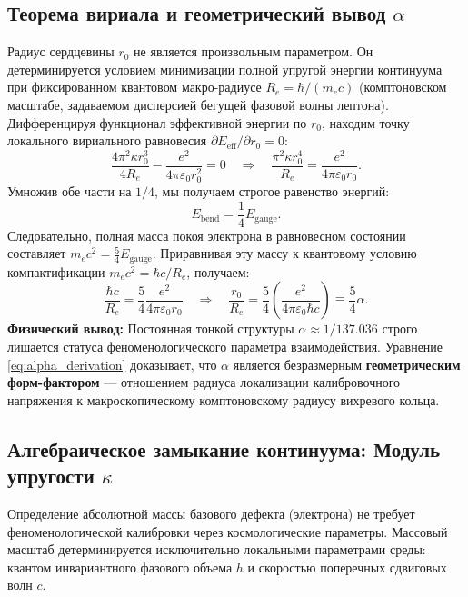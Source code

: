 \documentclass[11pt,a4paper]{article}
\begin{document}
\subsection{Теорема вириала и геометрический вывод $\alpha$}
Радиус сердцевины $r_0$ не является произвольным параметром. Он детерминируется условием минимизации полной упругой энергии континуума при фиксированном квантовом макро-радиусе $R_e = \hbar / (m_e c)$ (комптоновском масштабе, задаваемом дисперсией бегущей фазовой волны лептона).
Дифференцируя функционал эффективной энергии по $r_0$, находим точку локального вириального равновесия $\partial E_{\text{eff}} / \partial r_0 = 0$:
\begin{equation}
\frac{4 \pi^2 \kappa r_0^3}{4R_e} - \frac{e^2}{4\pi\varepsilon_0 r_0^2} = 0 \quad \Longrightarrow \quad \frac{\pi^2 \kappa r_0^4}{R_e} = \frac{e^2}{4\pi\varepsilon_0 r_0}.
\end{equation}
Умножив обе части на $1/4$, мы получаем строгое равенство энергий:
\begin{equation}
E_{\text{bend}} = \frac{1}{4} E_{\text{gauge}}.
\end{equation}
Следовательно, полная масса покоя электрона в равновесном состоянии составляет $m_e c^2 = \frac{5}{4} E_{\text{gauge}}$. Приравнивая эту массу к квантовому условию компактификации $m_e c^2 = \hbar c / R_e$, получаем:
\begin{equation}
\frac{\hbar c}{R_e} = \frac{5}{4} \frac{e^2}{4\pi\varepsilon_0 r_0} \quad \Longrightarrow \quad \frac{r_0}{R_e} = \frac{5}{4} \left( \frac{e^2}{4\pi\varepsilon_0 \hbar c} \right) \equiv \frac{5}{4} \alpha.
\label{eq:alpha_derivation}
\end{equation}
\textbf{Физический вывод:} Постоянная тонкой структуры $\alpha \approx 1/137.036$ строго лишается статуса феноменологического параметра взаимодействия. Уравнение \eqref{eq:alpha_derivation} доказывает, что $\alpha$ является безразмерным \textbf{геометрическим форм-фактором} — отношением радиуса локализации калибровочного напряжения к макроскопическому комптоновскому радиусу вихревого кольца.

\subsection{Алгебраическое замыкание континуума: Модуль упругости $\kappa$}
Определение абсолютной массы базового дефекта (электрона) не требует феноменологической калибровки через космологические параметры. Массовый масштаб детерминируется исключительно локальными параметрами среды: квантом инвариантного фазового объема $h$ и скоростью поперечных сдвиговых волн $c$.
\end{document}
